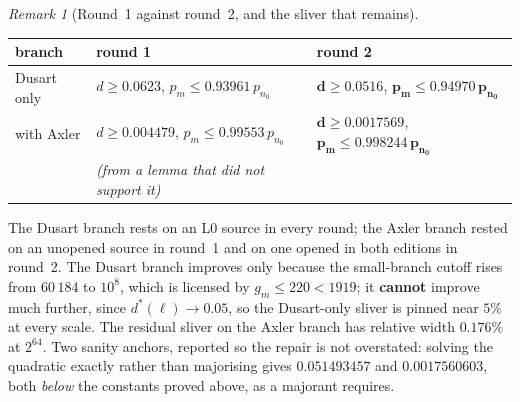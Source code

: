 \documentclass[11pt,a4paper]{article}
\theoremstyle{plain}
\theoremstyle{definition}
\theoremstyle{remark}
\newtheorem{remark}[theorem]{Remark}
\begin{document}
\begin{remark}[Round~1 against round~2, and the sliver that remains]
\label{rem:C-compare}
\begin{center}
\footnotesize
\begin{tabular}{@{}l l l@{}}
\toprule
branch & round 1 & \textbf{round 2} \\
\midrule
Dusart only & $d \ge 0.0623$, $p_m \le 0.93961\,p_{n_0}$ &
  $\mathbf{d \ge 0.0516}$, $\mathbf{p_m \le 0.94970\,p_{n_0}}$ \\
with Axler & $d \ge 0.004479$, $p_m \le 0.99553\,p_{n_0}$ &
  $\mathbf{d \ge 0.0017569}$, $\mathbf{p_m \le 0.998244\,p_{n_0}}$ \\
 & \emph{(from a lemma that did not support it)} & \\
\bottomrule
\end{tabular}
\end{center}
The Dusart branch rests on an L0 source in every round; the Axler branch rested on an unopened
source in round~1 and on one opened in both editions in round~2.
The Dusart branch improves only because the small-branch cutoff rises from $60\,184$ to $10^8$,
which is licensed by $g_m \le 220 < 1919$; it \textbf{cannot} improve much further, since
$d^*(\ell) \to 0.05$, so the Dusart-only sliver is pinned near $5\%$ at every scale. The
residual sliver on the Axler branch has relative width $0.176\%$ at $2^{64}$. Two sanity
anchors, reported so the repair is not overstated: solving the quadratic exactly rather than
majorising gives $0.051493457$ and $0.0017560603$, both \emph{below} the constants proved
above, as a majorant requires.
\end{remark}
\end{document}
